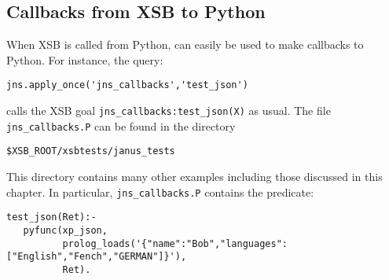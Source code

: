 

%
%
%
%
%

\subsection{Callbacks from XSB to Python} \label{sec:callbacks}

When XSB is called from Python, \janus{} can easily be used to make
callbacks to Python.  For instance, the query:

\begin{verbatim}
jns.apply_once('jns_callbacks','test_json')
\end{verbatim}

\noindent
calls the XSB goal {\tt jns\_callbacks:test\_json(X)} as usual.  The
file {\tt jns\_callbacks.P} can be found in the directory

\verb|$XSB_ROOT/xsbtests/janus_tests|

\noindent
This directory contains many other examples including those discussed
in this chapter.  In particular, {\tt jns\_callbacks.P} contains the
predicate:

\begin{verbatim}
test_json(Ret):- 
   pyfunc(xp_json,
          prolog_loads('{"name":"Bob","languages": ["English","Fench","GERMAN"]}'),
          Ret).
\end{verbatim}


